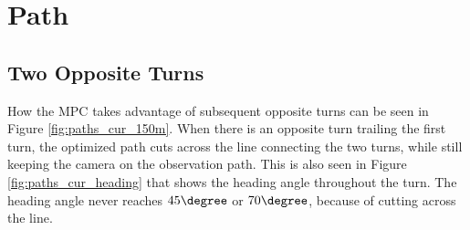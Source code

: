 \section{Path}

\subsection{Two Opposite Turns}

How the MPC takes advantage of subsequent opposite turns can be seen in Figure \ref{fig:paths_cur_150m}. When there is an opposite turn trailing the first turn, the optimized path cuts across the line connecting the two turns, while still keeping the camera on the observation path. This is also seen in Figure \ref{fig:paths_cur_heading} that shows the heading angle throughout the turn. The heading angle never reaches $45\degree$ or $70\degree$, because of cutting across the line.

